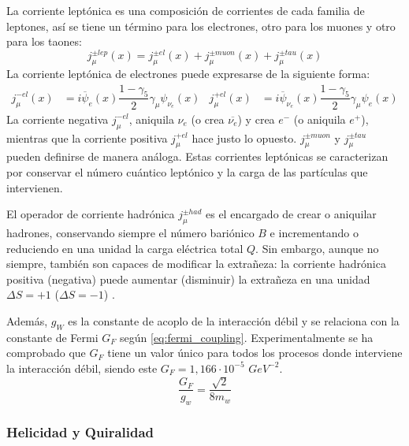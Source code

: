 La corriente leptónica es una composición de corrientes de cada familia de leptones, así se tiene un término para los electrones, otro para los muones y otro para los taones:
\begin{equation}
j_{\mu }^{\pm lep}\left( x\right) =j_{\mu }^{\pm el}\left( x\right) +j_{\mu }^{\pm muon}\left( x\right) +j_{\mu} ^{\pm tau}\left( x\right)\label{eq:leptonic_weak_current}
\end{equation}
La corriente leptónica de electrones puede expresarse de la siguiente forma:
\begin{align}
j_{\mu }^{-el}\left(x\right)&=i\overline{\psi}_{e}\left( x\right) \dfrac{1-\gamma_{5}}{2}\gamma _{\mu }\psi_{{ \nu}_{e}}\left( x\right) & j_{\mu}^{+el}\left(x\right)&= i\overline{\psi}_{{\nu}_{e}}\left(x\right) \dfrac{1-\gamma_{5}}{2}\gamma _{\mu}\psi_{e}\left( x\right)\label{eq:electric_weak_current}
\end{align}
La corriente negativa $j_{\mu }^{-el}$, aniquila $\nu_e$ (o crea $\overline{\nu_e}$) y crea $e^-$ (o aniquila $e^+$), mientras que la corriente positiva $j_{\mu }^{+el}$ hace justo lo opuesto. $j_{\mu }^{\pm muon}$ y $j_{\mu }^{\pm tau}$ pueden definirse de manera análoga. Estas corrientes leptónicas se caracterizan por conservar el número cuántico leptónico y la carga de las partículas que intervienen.

El operador de corriente hadrónica $j_{\mu} ^{\pm had}$ es el encargado de crear o aniquilar hadrones, conservando siempre el número bariónico $B$ e incrementando o reduciendo en una unidad la carga eléctrica total $Q$. Sin embargo, aunque no siempre, también son capaces de modificar la extrañeza: la corriente hadrónica positiva (negativa) puede aumentar (disminuir) la extrañeza en una unidad $\Delta S = +1$ ($\Delta S = -1$) \cite{notas2020}.

Además, $g_W$ es la constante de acoplo de la interacción débil y se relaciona con la constante de Fermi $G_F$ según \ref{eq:fermi_coupling}. Experimentalmente se ha comprobado que $G_F$ tiene un valor único para todos los procesos donde interviene la interacción débil, siendo este $G_{F}=1,166 \cdot 10^{-5}$ $GeV^{−2}$.
\begin{equation}
\dfrac{G_{F}}{g_{w}}=\dfrac{\sqrt{2}}{8m_{w}}\label{eq:fermi_coupling}
\end{equation}

\subsubsection{Helicidad y Quiralidad}\label{sec:quirality}

